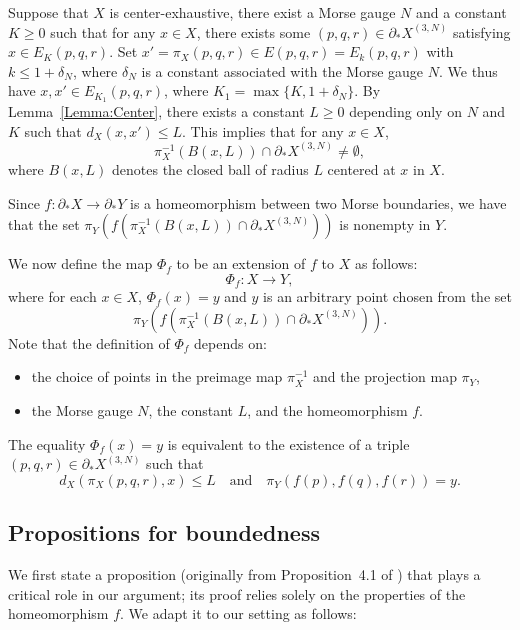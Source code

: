 \documentclass[a4paper,11pt,oneside]{article}
\begin{document}
 Suppose that $X$ is center-exhaustive, there exist a Morse gauge $N$ and a constant $K\ge0$ such that for any $x\in X$, there exists some $(p, q, r)\in \partial_*X^{(3, N)}$ satisfying $x\in E_K(p, q, r)$.
Set $x'=\pi_{X}(p, q, r)\in E(p, q, r)=E_{k}(p, q, r)$ with $k\le 1+\delta_N$, where $\delta_N$ is a constant associated with the Morse gauge $N$. We thus have
$x, x'\in E_{K_1}(p, q, r)$, where $K_1=\max\{K, 1+\delta_N\}$. 
By Lemma~\ref{Lemma:Center}, there exists a constant $L\ge0$ depending only on $N$ and $K$ such that $d_X(x, x')\le L$. This implies that for any $x\in X$, 
\[
\pi_{X}^{-1}(B(x, L))\cap \partial_*X^{(3, N)}\neq \emptyset,
\]
where $B(x, L)$ denotes the closed ball of radius $L$ centered at $x$ in $X$.

Since $f:\partial_*X\to \partial_*Y$ is a homeomorphism between two Morse boundaries, we have that the set $\pi_Y(f(\pi_{X}^{-1}(B(x, L))\cap \partial_*X^{(3, N)}))$ is nonempty in $Y$.

We now define the map $\Phi_f$ to be an extension of $f$ to $X$ as follows:
\[
\Phi_f:X\to Y,
\]
where for each $x\in X$, $\Phi_f(x)=y$ and $y$ is an arbitrary point chosen from the set
\[
\pi_Y(f(\pi_{X}^{-1}(B(x, L))\cap \partial_*X^{(3, N)})).
\]
Note that the definition of $\Phi_f$ depends on:
\begin{itemize}
    \item the choice of points in the preimage map $\pi_X^{-1}$ and the projection map $\pi_Y$,
    \item the Morse gauge $N$, the constant $L$, and the homeomorphism $f$.
\end{itemize}
The equality $\Phi_f(x)=y$ is equivalent to the existence of a triple $(p, q, r)\in \partial_*X^{(3, N)}$ such that
\begin{equation}\label{extension}
    d_{X}(\pi_X(p, q, r), x)\le L \quad \text{and} \quad \pi_Y(f(p), f(q), f(r))=y.
\end{equation}

\subsection{Propositions for boundedness}

We first state a proposition (originally from Proposition~4.1 of \cite{Liu22}) that plays a critical role in our argument; its proof relies solely on the properties of the homeomorphism $f$. We adapt it to our setting as follows:
\end{document}
